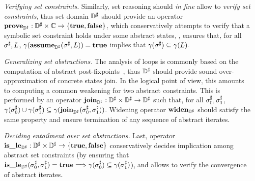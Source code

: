 \begin{asparaitem}
\item \emph{Verifying set constraints.}
  Similarly, set reasoning should {\em in fine} allow to {\em verify
    set constraints}, thus set domain \( {\mathbb{D}}^{\sharp} \) should provide an operator
  \( \textbf{prove}_{{\mathbb{D}}^{\sharp}}: {\mathbb{D}}^{\sharp} \times \mathbb{C} \rightarrow \{ \mathbf{true}, \mathbf{false} \} \),
  which conservatively attempts to verify that a symbolic set constraint
  holds under some abstract states, \ie, ensures that, for all \( {\sigma}^{\sharp},
  L \), \( \gamma( \textbf{assume}_{{\mathbb{D}}^{\sharp}}( {\sigma}^{\sharp}, L ) ) = \mathbf{true} \) implies that
  \( \gamma( {\sigma}^{\sharp} ) \subseteq \gamma( L ) \).

\item \emph{Generalizing set abstractions.}
  The analysis of loops is commonly based on the computation of abstract
  post-fixpoints~\cite{cc:popl:77}, thus \( {\mathbb{D}}^{\sharp} \) should provide
  sound over-approximation of concrete states join.
  In the logical point of view, this amounts to computing a common weakening
  for two abstract constraints.
  This is performed by an operator \( \textbf{join}_{{\mathbb{D}}^{\sharp}}: {\mathbb{D}}^{\sharp} \times {\mathbb{D}}^{\sharp}
  \rightarrow {\mathbb{D}}^{\sharp} \) such that, for all \( {\sigma}^{\sharp}_0, {\sigma}^{\sharp}_1 \),
  \( \gamma( {\sigma}^{\sharp}_0 ) \cup \gamma( {\sigma}^{\sharp}_1 ) \subseteq
  \gamma( \textbf{join}_{{\mathbb{D}}^{\sharp}}( {\sigma}^{\sharp}_0, {\sigma}^{\sharp}_1 ) ) \).
  Widening operator \( \textbf{widen}_{{\mathbb{D}}^{\sharp}} \) should satisfy the same property
  and ensure termination of any sequence of abstract iterates.

\item \emph{Deciding entailment over set abstractions.}
  Last, operator \( \textbf{is\_le}_{{\mathbb{D}}^{\sharp}}: {\mathbb{D}}^{\sharp} \times {\mathbb{D}}^{\sharp} \rightarrow \{ \mathbf{true},
  \mathbf{false} \} \) conservatively decides implication among abstract set
  constraints (by ensuring that \( \textbf{is\_le}_{{\mathbb{D}}^{\sharp}}( {\sigma}^{\sharp}_0, {\sigma}^{\sharp}_1 ) =
  \mathbf{true} \Longrightarrow \gamma( {\sigma}^{\sharp}_0 ) \subseteq \gamma(
  {\sigma}^{\sharp}_1 ) \)), and allows to verify the convergence of abstract
  iterates.
\end{asparaitem}
